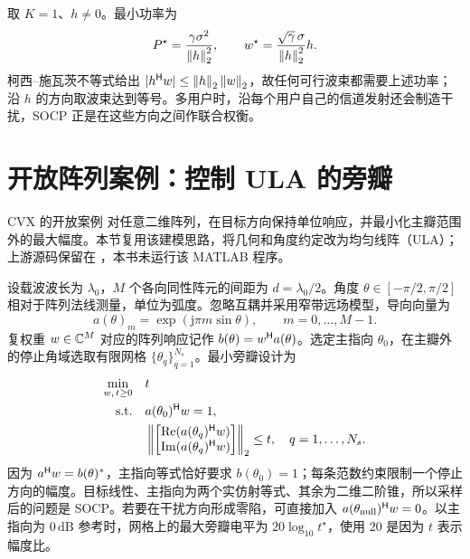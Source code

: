 \begin{example}[单用户的匹配波束]
取 $K=1$、$h\ne0$。最小功率为
\begin{equation}
 P^\star=\frac{\gamma\sigma^2}{\left\lVert h\right\rVert_2^2},
 \qquad w^\star=\frac{\sqrt\gamma\,\sigma}{\left\lVert h\right\rVert_2^2}h.
 \label{eq:matched-beam}
\end{equation}
柯西--施瓦茨不等式给出 $|h^\mathsf H w|\leq\left\lVert h\right\rVert_2\left\lVert w\right\rVert_2$，故任何可行波束都需要上述功率；沿 $h$ 的方向取波束达到等号。多用户时，沿每个用户自己的信道发射还会制造干扰，SOCP 正是在这些方向之间作联合权衡。
\end{example}

\section{开放阵列案例：控制 ULA 的旁瓣}
CVX 的开放案例  对任意二维阵列，在目标方向保持单位响应，并最小化主瓣范围外的最大幅度\cite{cvxexamples}。本节复用该建模思路，将几何和角度约定改为均匀线阵（ULA）；上游源码保留在 ，本书未运行该 MATLAB 程序。

设载波波长为 $\lambda_0$，$M$ 个各向同性阵元的间距为 $d=\lambda_0/2$。角度 $\theta\in[-\pi/2,\pi/2]$ 相对于阵列法线测量，单位为弧度。忽略互耦并采用窄带远场模型，导向向量为
\begin{equation}
 a(\theta)_m=\exp(\mathrm j\pi m\sin\theta),
 \qquad m=0,\ldots,M-1.
\end{equation}
复权重 $w\in\mathbb C^M$ 对应的阵列响应记作 $b(\theta)=w^\mathsf H a(\theta)$。选定主指向 $\theta_0$，在主瓣外的停止角域选取有限网格 $\{\theta_q\}_{q=1}^{N_s}$。最小旁瓣设计为
\begin{equation}
 \begin{aligned}
 \min_{w,\,t\geq0}\quad&t\\
 \text{s.t.}\quad&a(\theta_0)^\mathsf H w=1,\\
 &\left\|\begin{bmatrix}\operatorname{Re}(a(\theta_q)^\mathsf H w)\\
                   \operatorname{Im}(a(\theta_q)^\mathsf H w)\end{bmatrix}\right\|_2\leq t,
 \quad q=1,\ldots,N_s.
 \end{aligned}
 \label{eq:ula-sidelobe}
\end{equation}
因为 $a^\mathsf H w=b(\theta)^*$，主指向等式恰好要求 $b(\theta_0)=1$；每条范数约束限制一个停止方向的幅度。目标线性、主指向为两个实仿射等式、其余为二维二阶锥，所以采样后的问题是 SOCP。若要在干扰方向形成零陷，可直接加入 $a(\theta_{\rm null})^\mathsf H w=0$。以主指向为 $0\,\mathrm{dB}$ 参考时，网格上的最大旁瓣电平为 $20\log_{10}t^\star$，使用 $20$ 是因为 $t$ 表示幅度比。

